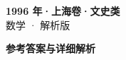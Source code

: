 \documentclass[zihao=-4, a4paper]{ctexart}
\begin{document}
\begin{center}
  {\Large\bfseries 1996 年·上海卷·文史类}\\[4pt]
  {\large 数学 · 解析版}
\end{center}
\medskip
{}

\clearpage
{}
\begin{center}{\Large\bfseries 参考答案与详细解析}\end{center}
\medskip

\end{document}
